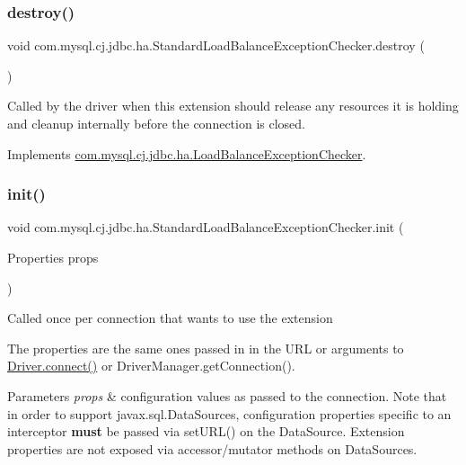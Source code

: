 \subsubsection{\texorpdfstring{destroy()}{destroy()}}
{\footnotesize\ttfamily void com.\+mysql.\+cj.\+jdbc.\+ha.\+Standard\+Load\+Balance\+Exception\+Checker.\+destroy (\begin{DoxyParamCaption}{ }\end{DoxyParamCaption})}

Called by the driver when this extension should release any resources it is holding and cleanup internally before the connection is closed. 

Implements \mbox{\hyperlink{interfacecom_1_1mysql_1_1cj_1_1jdbc_1_1ha_1_1_load_balance_exception_checker_a6737962a26ff1f3544dfbcc20954bade}{com.\+mysql.\+cj.\+jdbc.\+ha.\+Load\+Balance\+Exception\+Checker}}.

\mbox{\label{classcom_1_1mysql_1_1cj_1_1jdbc_1_1ha_1_1_standard_load_balance_exception_checker_af2f4516746c3615d1a4f3a191805b374}} 
\subsubsection{\texorpdfstring{init()}{init()}}
{\footnotesize\ttfamily void com.\+mysql.\+cj.\+jdbc.\+ha.\+Standard\+Load\+Balance\+Exception\+Checker.\+init (\begin{DoxyParamCaption}\item[{Properties}]{props }\end{DoxyParamCaption})}

Called once per connection that wants to use the extension

The properties are the same ones passed in in the U\+RL or arguments to \mbox{\hyperlink{classcom_1_1mysql_1_1cj_1_1jdbc_1_1_non_registering_driver_ab3fd3d522550db032eab6c240b554e3e}{Driver.\+connect()}} or Driver\+Manager.\+get\+Connection().


\begin{DoxyParams}{Parameters}
{\em props} & configuration values as passed to the connection. Note that in order to support javax.\+sql.\+Data\+Sources, configuration properties specific to an interceptor {\bfseries must} be passed via set\+U\+R\+L() on the Data\+Source. Extension properties are not exposed via accessor/mutator methods on Data\+Sources. \\
\hline
\end{DoxyParams}


